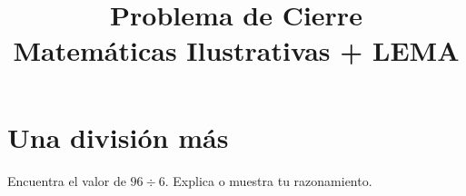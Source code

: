 \documentclass[,]{article}
\title{Problema de Cierre\\Matemáticas Ilustrativas + LEMA}
\date{}
\begin{document}
\maketitle
\vspace{-1cm}
\section*{Una división más}
Encuentra el valor de \(96 \div 6\). Explica o muestra tu razonamiento.%
\end{document}
